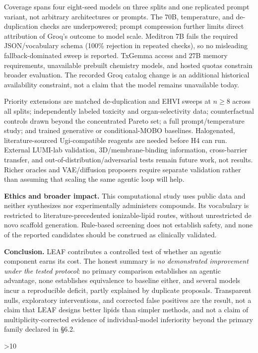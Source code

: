 \documentclass{article}
\begin{document}
Coverage spans four eight-seed models on three splits and one replicated prompt variant, not arbitrary architectures or prompts. The 70B, temperature, and de-duplication checks are underpowered; prompt compression further limits direct attribution of Groq's outcome to model scale. Meditron 7B fails the required JSON/vocabulary schema (100\% rejection in repeated checks), so no misleading fallback-dominated sweep is reported. TxGemma access and 27B memory requirements, unavailable prebuilt chemistry models, and hosted quotas constrain broader evaluation. The recorded Groq catalog change is an additional historical availability constraint, not a claim that the model remains unavailable today.

Priority extensions are matched de-duplication and EHVI sweeps at $n\ge8$ across all splits; independently labeled toxicity and organ-selectivity data; counterfactual controls drawn beyond the concentrated Pareto set; a full prompt/temperature study; and trained generative or conditional-MOBO baselines. Halogenated, literature-sourced Ugi-compatible reagents are needed before H4 can run. External LUMI-lab validation, 3D/membrane-binding information, cross-barrier transfer, and out-of-distribution/adversarial tests remain future work, not results. Richer oracles and VAE/diffusion proposers require separate validation rather than assuming that scaling the same agentic loop will help.

\textbf{Ethics and broader impact.} This computational study uses public data and neither synthesizes nor experimentally administers compounds. Its vocabulary is restricted to literature-precedented ionizable-lipid routes, without unrestricted de novo scaffold generation. Rule-based screening does not establish safety, and none of the reported candidates should be construed as clinically validated.

\textbf{Conclusion.} LEAF contributes a controlled test of whether an agentic component earns its cost. The honest summary is \emph{no demonstrated improvement under the tested protocol}: no primary comparison establishes an agentic advantage, none establishes equivalence to baseline either, and several models incur a reproducible deficit, partly explained by duplicate proposals. Transparent nulls, exploratory interventions, and corrected false positives are the result, not a claim that LEAF designs better lipids than simpler methods, and not a claim of multiplicity-corrected evidence of individual-model inferiority beyond the primary family declared in \S6.2.

\label{main-text-end}
\clearpage
\ifnum\value{page}>10
  \PackageError{LEAF}{Main content exceeds nine pages}{Condense the main text or reposition floats without changing the NeurIPS style.}
\fi
\begingroup
\small

\endgroup
\clearpage
\appendix

\end{document}
